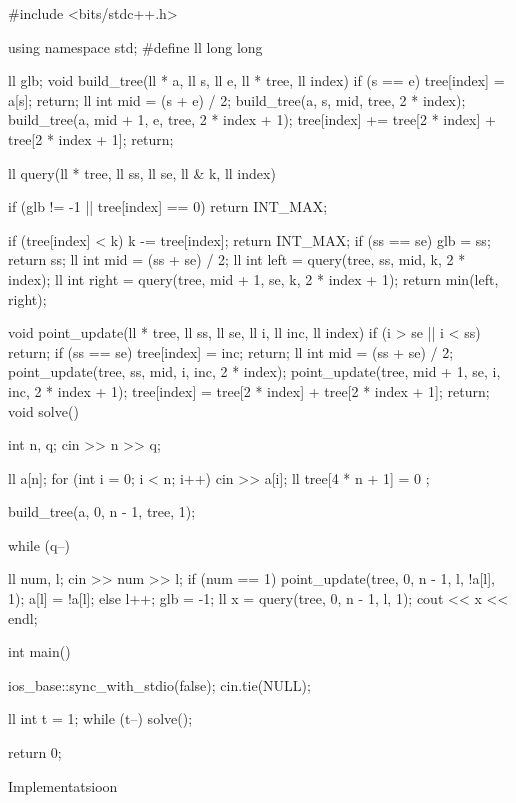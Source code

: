\documentclass{trkut}
\begin{document}
\begin{cclol}
#include <bits/stdc++.h>

using namespace std;
#define ll long long

ll glb;
void build_tree(ll * a, ll  s, ll e, ll * tree, ll  index) {
  if (s == e) {
    tree[index] = a[s];
    return;
  }
  ll int mid = (s + e) / 2;
  build_tree(a, s, mid, tree, 2 * index);
  build_tree(a, mid + 1, e, tree, 2 * index + 1);
  tree[index] += tree[2 * index] + tree[2 * index + 1];
  return;
}

ll query(ll * tree, ll ss, ll se, ll & k, ll index) {
  if (glb != -1 || tree[index] == 0)
    return INT_MAX;

  if (tree[index] < k) {
    k -= tree[index];
    return INT_MAX;
  }
  if (ss == se) {
    glb = ss;
    return ss;
  }
  ll int mid = (ss + se) / 2;
  ll int left = query(tree, ss, mid, k, 2 * index);
  ll int right = query(tree, mid + 1, se, k, 2 * index + 1);
  return min(left, right);
}
void point_update(ll * tree, ll ss, ll se, ll i, ll inc, ll index) {
  if (i > se || i < ss)
    return;
  if (ss == se) {
    tree[index] = inc;
    return;
  }
  ll int mid = (ss + se) / 2;
  point_update(tree, ss, mid, i, inc, 2 * index);
  point_update(tree, mid + 1, se, i, inc, 2 * index + 1);
  tree[index] = tree[2 * index] + tree[2 * index + 1];
  return;
}
void solve() {
  int n, q;
  cin >> n >> q;

  ll a[n];
  for (int i = 0; i < n; i++)
    cin >> a[i];
  ll tree[4 * n + 1] = {
    0
  };

  build_tree(a, 0, n - 1, tree, 1);

  while (q--) {
    ll num, l;
    cin >> num >> l;
    if (num == 1) {
      point_update(tree, 0, n - 1, l, !a[l], 1);
      a[l] = !a[l];
    } else {
      l++;
      glb = -1;
      ll x = query(tree, 0, n - 1, l, 1);
      cout << x << endl;
    }

  }

}
int main() {
  ios_base::sync_with_stdio(false);
  cin.tie(NULL);

  ll int t = 1;
  while (t--) {
    solve();
  }

  return 0;
}
\end{cclol}
\begin{kk}[H]%
    \caption{Implementatsioon}%
    \label{EMaxx}%
    \end{kk}
\end{document}

